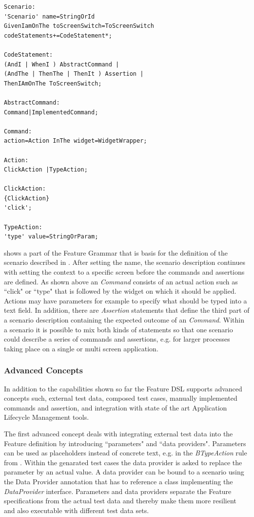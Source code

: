 \documentclass{sig-alternate-05-2015}
\begin{document}
\begin{lstlisting}[captionpos=b, caption=Feature Grammar, label={lst:featureGrammar}, language=xtext]
Scenario:
'Scenario' name=StringOrId
GivenIamOnThe toScreenSwitch=ToScreenSwitch 
codeStatements+=CodeStatement*;

CodeStatement:
(AndI | WhenI ) AbstractCommand | 
(AndThe | ThenThe | ThenIt ) Assertion |   
ThenIAmOnThe ToScreenSwitch;

AbstractCommand:
Command|ImplementedCommand;

Command:
action=Action InThe widget=WidgetWrapper;

Action:
ClickAction |TypeAction;

ClickAction:
{ClickAction}
'click';

TypeAction:
'type' value=StringOrParam;
\end{lstlisting}

 shows a part of the Feature Grammar that is basis for the definition of the scenario described in .
After setting the name, the scenario description continues with setting the context to a specific screen before the commands and assertions are defined.
As shown above an \textit{Command} consists of an actual action such as ``click" or ``type" that is followed by the widget on which it should be applied.
Actions may have parameters for example to specify what should be typed into a text field. 
In addition, there are \textit{Assertion} statements that define the third part of a scenario description containing the expected outcome of an \textit{Command}.
Within a scenario it is possible to mix both kinds of statements so that one scenario could describe a series of commands and assertions, e.g. for larger processes taking place on a single or multi screen application.   

\subsubsection{Advanced Concepts}
In addition to the capabilities shown so far the Feature DSL supports advanced concepts such, external test data, composed test cases, manually implemented commands and assertion, and integration with state of the art Application Lifecycle Management tools.
 
The first advanced concept deals with integrating external test data into the Feature definition by introducing ``parameters" and ``data providers".
Parameters can be used as placeholders instead of concrete text, e.g. in the \textit{BTypeAction} rule from .
Within the genarated test cases the data provider is asked to replace the parameter by an actual value.
A data provider can be bound to a scenario using the Data Provider annotation that has to reference a class implementing the \textit{DataProvider} interface.
Parameters and data providers separate the Feature specifications from the actual test data and thereby make them more resilient and also executable with different test data sets.
\end{document}
